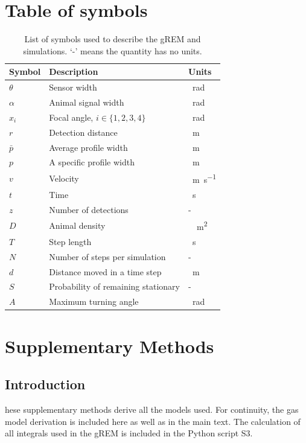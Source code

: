   

\clearpage
\section{Table of symbols}

\begin{table}[h!]
\centering
\caption[List of symbols used to describe the gREM and simulations]{List of symbols used to describe the gREM and simulations. `-' means the quantity has no units.}
\begin{tabular}{@{}lll@{}}
\toprule
Symbol 	& Description & Units\\
\midrule
$\theta$	& Sensor width & \SI{}{\radian} \\
$\alpha$	& Animal signal width & \SI{}{\radian} \\
$x_i$	        & Focal angle, $i \in \{1,2,3,4\} $ 	& \SI{}{\radian}\\
$r$ 		& Detection distance & \SI{}{\meter}\\
$\bar{p}$ 		& Average profile width & \SI{}{\meter}\\
$p$ 		& A specific profile width & \SI{}{\meter}\\
$v$		& Velocity & \SI{}{\meter\per\second}\\
$t$		& Time & \SI{}{\second}\\
$z$		& Number of detections & -\\
$D$		& Animal density & \SI{}{\per\meter\squared} \\
$T$ 		& Step length & \SI{}{\second}\\
$N$ 		& Number of steps per simulation & -\\
$d$ 		& Distance moved in a time step & \SI{}{\meter}\\
$S$ 		& Probability of remaining stationary & -\\
$A$ 		& Maximum turning angle & \SI{}{\radian}\\
\bottomrule
\end{tabular}
\label{t:paras}
\end{table}

\clearpage

\section{Supplementary Methods}
\subsection{Introduction}
hese supplementary methods derive all the models used. 
For continuity, the gas model derivation is included here as well as in the main text. 
The calculation of all integrals used in the gREM is included in the Python script S3. 


